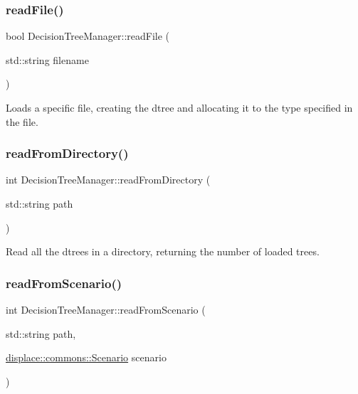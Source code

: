 \subsubsection{\texorpdfstring{readFile()}{readFile()}}
{\footnotesize\ttfamily bool Decision\+Tree\+Manager\+::read\+File (\begin{DoxyParamCaption}\item[{std\+::string}]{filename }\end{DoxyParamCaption})\hspace{0.3cm}{\ttfamily [protected]}}



Loads a specific file, creating the dtree and allocating it to the type specified in the file. 

\mbox{\label{classdtree_1_1_decision_tree_manager_afffc6c22eead268bef29b980e298dc82}} 
\subsubsection{\texorpdfstring{readFromDirectory()}{readFromDirectory()}}
{\footnotesize\ttfamily int Decision\+Tree\+Manager\+::read\+From\+Directory (\begin{DoxyParamCaption}\item[{std\+::string}]{path }\end{DoxyParamCaption})}



Read all the dtrees in a directory, returning the number of loaded trees. 

\mbox{\label{classdtree_1_1_decision_tree_manager_a881d41c8c321734312bb2aa7382de08a}} 
\subsubsection{\texorpdfstring{readFromScenario()}{readFromScenario()}}
{\footnotesize\ttfamily int Decision\+Tree\+Manager\+::read\+From\+Scenario (\begin{DoxyParamCaption}\item[{std\+::string}]{path,  }\item[{\mbox{\hyperlink{structdisplace_1_1commons_1_1_scenario}{displace\+::commons\+::\+Scenario}}}]{scenario }\end{DoxyParamCaption})}

